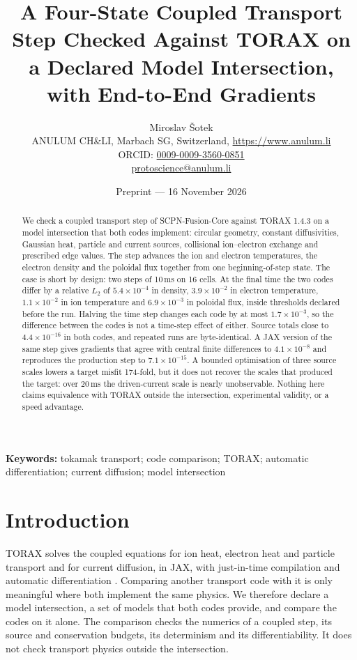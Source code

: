 \documentclass[11pt]{article}
\title{A Four-State Coupled Transport Step Checked Against TORAX on a Declared
Model Intersection, with End-to-End Gradients}
\author{Miroslav \v{S}otek\\
\small ANULUM CH\&LI, Marbach SG, Switzerland, \url{https://www.anulum.li}\\
\small ORCID: \href{https://orcid.org/0009-0009-3560-0851}{0009-0009-3560-0851}\\
\small \href{mailto:protoscience@anulum.li}{protoscience@anulum.li}}
\date{Preprint --- 16 November 2026}
\begin{document}
\maketitle

\begin{abstract}
We check a coupled transport step of SCPN-Fusion-Core against TORAX 1.4.3 on a
model intersection that both codes implement: circular geometry, constant
diffusivities, Gaussian heat, particle and current sources, collisional
ion--electron exchange and prescribed edge values.  The step advances the ion
and electron temperatures, the electron density and the poloidal flux together
from one beginning-of-step state.  The case is short by design: two steps of
10\,ms on 16 cells.  At the final time the two codes differ by a relative $L_2$
of $5.4 \times 10^{-4}$ in density, $3.9 \times 10^{-2}$ in electron temperature,
$1.1 \times 10^{-2}$ in ion temperature and $6.9 \times 10^{-3}$ in poloidal
flux, inside thresholds declared before the run.  Halving the time step changes
each code by at most $1.7 \times 10^{-3}$, so the difference between the codes
is not a time-step effect of either.  Source totals close to $4.4 \times
10^{-16}$ in both codes, and repeated runs are byte-identical.  A JAX version of
the same step gives gradients that agree with central finite differences to
$4.1 \times 10^{-8}$ and reproduces the production step to $7.1 \times
10^{-15}$.  A bounded optimisation of three source scales lowers a target
misfit 174-fold, but it does not recover the scales that produced the target:
over 20\,ms the driven-current scale is nearly unobservable.  Nothing here
claims equivalence with TORAX outside the intersection, experimental
validity, or a speed advantage.
\end{abstract}

\noindent\textbf{Keywords:} tokamak transport; code comparison; TORAX;
automatic differentiation; current diffusion; model intersection

\section{Introduction}

TORAX solves the coupled equations for ion heat, electron heat and particle
transport and for current diffusion, in JAX, with just-in-time compilation and
automatic differentiation \citep{Citrin2024}.  Comparing another transport
code with it is only meaningful where both implement the same physics.  We
therefore declare a model intersection, a set of models that both codes
provide, and compare the codes on it alone.  The comparison checks the
numerics of a coupled step, its source and conservation budgets, its
determinism and its differentiability.  It does not check transport physics
outside the intersection.
\end{document}
